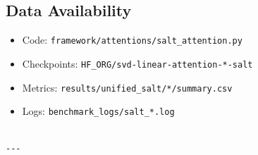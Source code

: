 \subsection{Data Availability}

\begin{itemize}
\item Code: \texttt{framework/attentions/salt\_attention.py}
\item Checkpoints: \texttt{{{HF\_ORG}}/svd-linear-attention-*-salt}
\item Metrics: \texttt{results/unified\_salt/*/summary.csv}
\item Logs: \texttt{benchmark\_logs/salt\_*.log}
\end{itemize}
\begin{lstlisting}

---
\end{lstlisting}